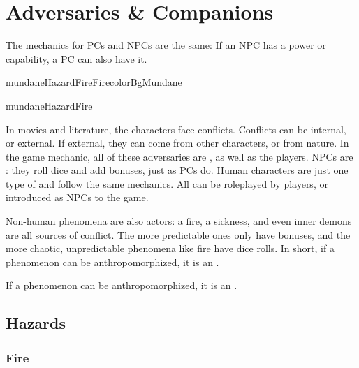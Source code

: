 \chapterspaceabove{6.75cm}
\chapterspacebelow{11.25cm}


\chapter{Adversaries \& Companions}

\begin{emphasisParagraph}
	The mechanics for PCs and NPCs are the same: If an NPC has a power or capability,
	a PC can also have it.
\end{emphasisParagraph}

\begin{actorCardMiniEuro}{mundaneHazardFire}{Fire}{colorBgMundane}
	\begin{natureBox}{mundaneHazardFire}
	\end{natureBox}
\end{actorCardMiniEuro}


In movies and literature, the characters face conflicts.
Conflicts can be internal, or external.
If external, they can come from other characters, or from nature.
In the game mechanic, all of these adversaries are , as well as the players.
NPCs are : they roll dice and add bonuses, just as PCs do.
Human characters are just one type of  and follow the same mechanics.
All  can be roleplayed by players, or introduced as NPCs to the game.

Non-human phenomena are also actors: a fire, a sickness, and even inner demons are all
sources of conflict. The more predictable ones only have bonuses, and the more
chaotic, unpredictable phenomena like fire have dice rolls.
In short, if a phenomenon can be anthropomorphized, it is an .

\begin{emphasisParagraph}
	If a phenomenon can be anthropomorphized, it is an .
\end{emphasisParagraph}



\section{Hazards}

\subsection{Fire}

